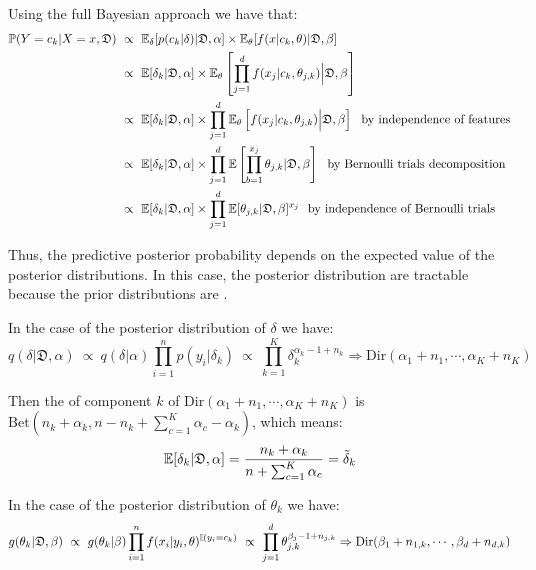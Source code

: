 Using the full Bayesian approach we have that:
\begin{align*}
    \operatorname{\mathbb{P}}(Y=c_k|X =x,\mathfrak{D})\
    &\propto\ \operatorname{\mathbb{E}}_{\delta}[p(c_k|\delta)|\mathfrak{D},\alpha]\times \operatorname{\mathbb{E}}_{\theta}[f(x|c_k,\theta)|\mathfrak{D},\beta] \\
    &\propto\ \operatorname{\mathbb{E}} [\delta_k|\mathfrak{D},\alpha] \times \operatorname{\mathbb{E}}_{\theta}\left[\prod_{j=1}^d  f(x_j|c_k,\theta_{j,k}) \Big|\mathfrak{D},\beta\right]\\
    &\propto\ \operatorname{\mathbb{E}} [\delta_k|\mathfrak{D},\alpha] \times \prod_{j=1}^d\operatorname{\mathbb{E}}_{\theta}\left[  f(x_j|c_k,\theta_{j,k}) \Big|\mathfrak{D},\beta\right]\ \text{ by independence of features} \\
    &\propto\ \operatorname{\mathbb{E}} [\delta_k|\mathfrak{D},\alpha]\times\prod_{j=1}^d \operatorname{\mathbb{E}} \left[\prod_{b=1}^{x_j}\theta_{j,k}|\mathfrak{D},\beta\right]\ \text{ by Bernoulli trials decomposition}\\
    &\propto\ \operatorname{\mathbb{E}} [\delta_k|\mathfrak{D},\alpha]\times\prod_{j=1}^d \operatorname{\mathbb{E}} [\theta_{j,k}|\mathfrak{D},\beta]^{x_j}\ \text{ by independence of Bernoulli trials}
\end{align*}

Thus, the predictive posterior probability depends on the expected value of the posterior distributions. In this case, the posterior distribution are tractable because the prior distributions are .

In the case of the posterior distribution of $\delta$ we have:
\begin{equation*}
    q(\delta|\mathfrak{D},\alpha)\ \propto\ q(\delta|\alpha)\prod_{i=1}^n p(y_i|\delta_k)\ \propto\ \prod_{k=1}^K\delta_k^{\alpha_k-1+n_k}\Rightarrow \text{Dir}(\alpha_1+n_1,\cdots,\alpha_K+n_K)
\end{equation*}

Then the  of component $k$ of $\text{Dir}(\alpha_1+n_1,\cdots,\alpha_K+n_K)$ is $\text{Bet}(n_k+\alpha_k, n-n_k+\sum_{c=1}^K\alpha_c-\alpha_k)$, which means:
\begin{equation*}
    \operatorname{\mathbb{E}} [\delta_k|\mathfrak{D},\alpha] = \frac{n_k+\alpha_k}{n+\sum_{c=1}^K\alpha_c} = \Tilde{\delta}_k
\end{equation*}

In the case of the posterior distribution of $\theta_k$ we have:
\begin{equation*}
    g(\theta_k|\mathfrak{D},\beta)\  \propto\  g(\theta_k|\beta)\prod_{i=1}^n f(x_i|y_i,\theta)^{\operatorname{\mathbb{I}}(y_i=c_k)}\ \propto\ \prod_{j=1}^d \theta_{j,k}^{\beta_j-1+n_{j,k}}\Rightarrow \text{Dir}(\beta_1+n_{1,k},\cdots,\beta_d+n_{d,k})
\end{equation*}

